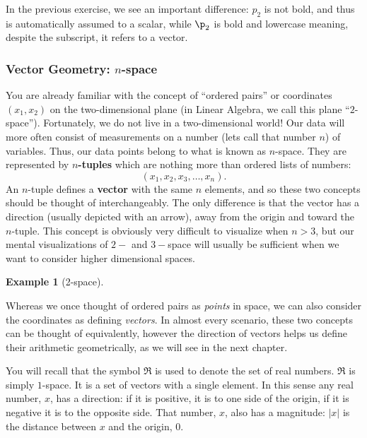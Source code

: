 \documentclass[
]{article}
\theoremstyle{definition}
\theoremstyle{definition}
\newtheorem{example}{Example}[section]
\theoremstyle{definition}
\theoremstyle{definition}
\theoremstyle{remark}
\begin{document}
In the previous exercise, we see an important difference: \(p_2\) is not bold, and thus is automatically assumed to a scalar, while \(\p_2\) is bold and lowercase meaning, despite the subscript, it refers to a vector.

\hypertarget{vector-geometry-n-space}{%
\subsubsection{\texorpdfstring{Vector Geometry: \(n\)-space}{Vector Geometry: n-space}}\label{vector-geometry-n-space}}

You are already familiar with the concept of ``ordered pairs'' or coordinates \((x_1,x_2)\) on the two-dimensional plane (in Linear Algebra, we call this plane ``\(2\)-space''). Fortunately, we do not live in a two-dimensional world! Our data will more often consist of measurements on a number (lets call that number \(n\)) of variables. Thus, our data points belong to what is known as \(n\)-space. They are represented by \textbf{\(n\)-tuples} which are nothing more than ordered lists of numbers:
\[(x_1, x_2, x_3, \dots, x_n).\]
An \(n\)-tuple defines a \textbf{vector} with the same \(n\) elements, and so these two concepts should be thought of interchangeably. The only difference is that the vector has a direction (usually depicted with an arrow), away from the origin and toward the \(n\)-tuple. This concept is obviously very difficult to visualize when \(n>3\), but our mental visualizations of \(2-\) and \(3-\)space will usually be sufficient when we want to consider higher dimensional spaces.

\begin{example}[2-space]
\protect\hypertarget{exm:twospace}{}\label{exm:twospace}

Whereas we once thought of ordered pairs as \emph{points} in space, we can also consider the coordinates as defining \emph{vectors}. In almost every scenario, these two concepts can be thought of equivalently, however the direction of vectors helps us define their arithmetic geometrically, as we will see in the next chapter.

\end{example}

You will recall that the symbol \(\Re\) is used to denote the set of real numbers. \(\Re\) is simply \(1\)-space. It is a set of vectors with a single element. In this sense any real number, \(x\), has a direction: if it is positive, it is to one side of the origin, if it is negative it is to the opposite side. That number, \(x\), also has a magnitude: \(|x|\) is the distance between \(x\) and the origin, 0.
\end{document}
